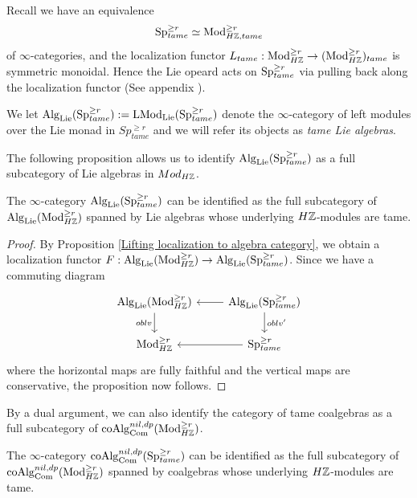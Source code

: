 Recall we have an equivalence 
$$
\operatorname{Sp}^{\geq r}_{tame}
\simeq
\operatorname{Mod}_{H{\mathbb{Z}}, tame}^{\geq r}
$$
of $\infty$-categories, and the localization functor $L_{tame}:\operatorname{Mod}_{H{\mathbb{Z}}}^{\geq r}\to (\operatorname{Mod}_{H{\mathbb{Z}}}^{\geq r})_{tame}$ is symmetric monoidal. Hence the Lie opeard acts on $\operatorname{Sp}_{tame}^{\geq r}$ via pulling back along the localization functor (See appendix ).
\begin{definition}
	We let $\operatorname{Alg}_{\operatorname{Lie}}(\operatorname{Sp}^{\geq r}_{tame}):= \operatorname{LMod}_{\operatorname{Lie}}(\operatorname{Sp}^{\geq r}_{tame})$ denote the $\infty$-category of left modules over the Lie monad in $Sp^{\geq r}_{tame}$ and we will refer its objects as \textit{tame Lie algebras}.
	
\end{definition}

The following proposition allows us to identify $\operatorname{Alg}_{\operatorname{Lie}}(\operatorname{Sp}^{\geq r}_{tame})$ as a full subcategory of Lie algebras in $Mod_{H{\mathbb{Z}}}$.

\begin{proposition}
\label{Identification of tame Lie algebras}
	The $\infty$-category $\operatorname{Alg}_{\operatorname{Lie}}(\operatorname{Sp}^{\geq r}_{tame})$ can be identified as the full subcategory of $\operatorname{Alg}_{\operatorname{Lie}}(\operatorname{Mod}_{H{\mathbb{Z}}}^{\geq r})$ spanned by Lie algebras whose underlying $H{\mathbb{Z}}$-modules are tame.
\end{proposition}
\begin{proof}
	By Proposition \ref{Lifting localization to algebra category}, we obtain a localization functor
	$F: \operatorname{Alg}_{\operatorname{Lie}}(\operatorname{Mod}_{H{\mathbb{Z}}}^{\geq r}) \to \operatorname{Alg}_{\operatorname{Lie}}(\operatorname{Sp}^{\geq r}_{tame})$. Since we have a commuting diagram
\[
\begin{tikzcd}
	\Alg_{\Lie}(\Mod_{H\BZ}^{\geq r}) & \Alg_{\Lie}(\Sp^{\geq r}_{tame})\\
	\Mod_{H\BZ}^{\geq r}  & 
	\Sp^{\geq r}_{tame}
	\arrow[from=1-2, to= 1-1]
	\arrow[from=1-1, to=2-1, "\oblv" left]
	\arrow[from=1-2, to=2-2, "\oblv'" ]
	\arrow[from=2-2, to= 2-1]
\end{tikzcd}
\]
where the horizontal maps are fully faithful and the vertical maps are conservative, the proposition now follows.
\end{proof}

By a dual argument, we can also identify the category of tame coalgebras as a full subcategory of $\operatorname{coAlg}^{nil, dp}_{\operatorname{Com}}(\operatorname{Mod}_{H{\mathbb{Z}}}^{\geq r})$.
\begin{proposition}
	The $\infty$-category $\operatorname{coAlg}^{nil, dp}_{\operatorname{Com}}(\operatorname{Sp}^{\geq r}_{tame})$ can be identified as the full subcategory of $\operatorname{coAlg}^{nil, dp}_{\operatorname{Com}}(\operatorname{Mod}_{H{\mathbb{Z}}}^{\geq r})$ spanned by coalgebras whose underlying $H{\mathbb{Z}}$-modules are tame.	
\end{proposition}

